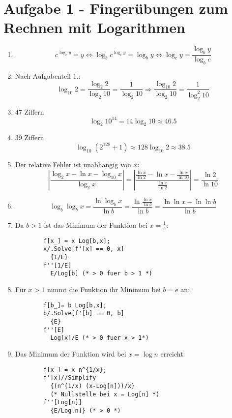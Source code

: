 \section*{Aufgabe 1 - Fingerübungen zum Rechnen mit Logarithmen}

\begin{enumerate}
\item
	\[ c^{\log_c y} = y \Leftrightarrow 
	\log_b c^{\log_c y} = \log_b y \Leftrightarrow \log_c y =
	\frac{\log_b y}{\log_b c}\]
\item Nach Aufgabenteil 1.:
	\[ \log_{10} 2 = \frac{\log_2 2}{\log_2 10} = \frac{1}{\log_2 10} \Rightarrow \frac{\log_{10} 2}{\log_2 10} = \frac{1}{\log_2^2 10} \]

\item 47 Ziffern \[ \log_2 10^{14} = 14 \log_2 10 \approx 46.5 \]

\item 39 Ziffern \[ \log_{10} (2^{128} + 1) \approx 128 \log_{10} 2 \approx 38.5 \]

\item Der relative Fehler ist unabhängig von $x$:
	\[ \left| \frac{\log_2 x - \ln x - \log_{10} x}{\log_2 x} \right| =
	\left| \frac{\frac{\ln x}{\ln 2} - \ln x - \frac{\ln x}{\ln 10}}{\frac{\ln x}{\ln 2}} \right| = \frac{\ln 2}{\ln 10} \]

\item
	\[ \log_b \log_b x = \frac{\ln \log_b x}{\ln b} = \frac{\ln \frac{\ln x}{\ln b}}{\ln b} = \frac{\ln \ln x - \ln \ln b}{\ln b}\]

\item Da $b > 1$ ist das Minimum der Funktion bei $x = \frac{1}{e}$:
	\lstset{language=Mathematice}
	\begin{lstlisting}
		f[x_] = x Log[b,x];
		x/.Solve[f'[x] == 0, x]
		  {1/E}
		f''[1/E]
		  E/Log[b] (* > 0 fuer b > 1 *)
	\end{lstlisting}

\item Für $x > 1$ nimmt die Funktion ihr Minimum bei $b = e$ an:
	\begin{lstlisting}
		f[b_]= b Log[b,x];
		b/.Solve[f'[b] == 0, b]
		  {E}
		f''[E]
		  Log[x]/E (* > 0 fuer x > 1*)
	\end{lstlisting}

\item Das Minimum der Funktion wird bei $x = \log n$ erreicht:
	\begin{lstlisting}
		f[x_] = x n^{1/x};
		f'[x]//Simplify
		  {(n^(1/x) (x-Log[n]))/x}
		  (* Nullstelle bei x = Log[n] *)
		f''[Log[n]]
		  {E/Log[n]} (* > 0 *)
	\end{lstlisting}


\end{enumerate}
